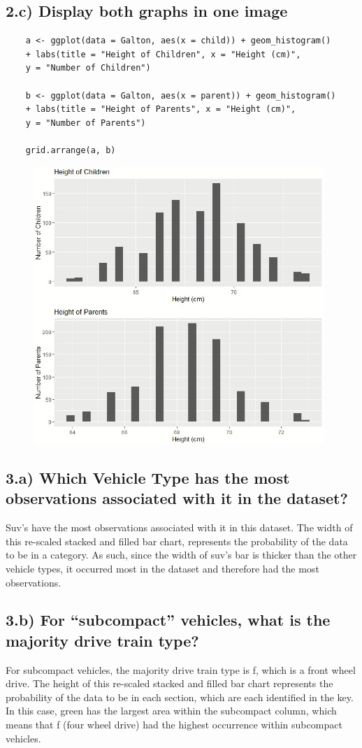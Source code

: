 \documentclass[11pt]{article}
\begin{document}
\subsection*{2.c) Display both graphs in one image}
\begin{verbatim}
    a <- ggplot(data = Galton, aes(x = child)) + geom_histogram() 
    + labs(title = "Height of Children", x = "Height (cm)",
    y = "Number of Children")

    b <- ggplot(data = Galton, aes(x = parent)) + geom_histogram() 
    + labs(title = "Height of Parents", x = "Height (cm)", 
    y = "Number of Parents")

    grid.arrange(a, b)
\end{verbatim}

\begin{figure}[h]
\includegraphics[width = 11cm]{2c.jpg}
\centering
\end{figure}

\subsection*{3.a) Which Vehicle Type has the most observations associated with it in the dataset?}
Suv's have the most observations associated with it in this dataset. The width of this re-scaled stacked and filled bar chart, represents the probability of the data to be in a category. As such, since the width of suv's bar is thicker than the other vehicle types, it occurred most in the dataset and therefore had the most observations.

\subsection*{3.b) For “subcompact” vehicles, what is the majority drive train type?}
For subcompact vehicles, the majority drive train type is f, which is a front wheel drive. The height of this re-scaled stacked and filled bar chart represents the probability of the data to be in each section, which are each identified in the key. In this case, green has the largest area within the subcompact column, which means that f (four wheel drive) had the highest occurrence within subcompact vehicles.
\end{document}
